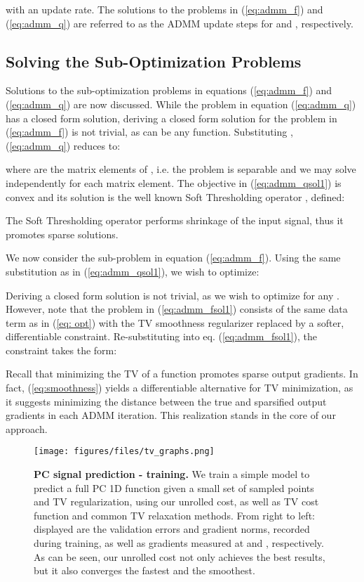 \documentclass[10pt,twocolumn,letterpaper]{article}
\begin{document}
with  an update rate. The solutions to the problems in (\ref{eq:admm_f}) and (\ref{eq:admm_q}) are referred to as the ADMM update steps for  and , respectively.

\subsection{Solving the Sub-Optimization Problems}
Solutions to the sub-optimization problems in equations (\ref{eq:admm_f}) and (\ref{eq:admm_q}) are now discussed. 
While the problem in equation (\ref{eq:admm_q}) has a closed form solution, deriving a closed form solution for the problem in (\ref{eq:admm_f}) is not trivial, as  can be any function.
Substituting , (\ref{eq:admm_q}) reduces to:

where  are the matrix elements of , i.e. the problem is separable and we may solve independently for each matrix element. The objective in (\ref{eq:admm_qsol1}) is convex and its solution is the well known Soft Thresholding operator , defined:

The Soft Thresholding operator performs shrinkage of the input signal, thus it promotes sparse solutions.

We now consider the sub-problem in equation (\ref{eq:admm_f}). Using the same substitution as in (\ref{eq:admm_qsol1}), we wish to optimize:

Deriving a closed form solution is not trivial, as we wish to optimize for any . However, note that the problem in (\ref{eq:admm_fsol1}) consists of the same data term as in (\ref{eq: opt}) with the TV smoothness regularizer replaced by a softer, differentiable constraint. Re-substituting into eq. (\ref{eq:admm_fsol1}), the constraint takes the form:

Recall that minimizing the TV of a function promotes sparse output gradients. In fact, (\ref{eq:smoothness}) yields a differentiable alternative for TV minimization, as it suggests minimizing the  distance between the true and sparsified output gradients in each ADMM iteration. This realization stands in the core of our approach.



\begin{figure*}
\begin{center}
\texttt{[image: figures/files/tv\_graphs.png]}
   \caption{\textbf{PC signal prediction - training.} We train a simple model to predict a full PC 1D function given a small set of sampled points and TV regularization, using our unrolled cost, as well as TV cost function and common TV relaxation methods. From right to left: displayed are the validation errors and gradient norms, recorded during training, as well as gradients measured at  and , respectively. As can be seen, our unrolled cost not only achieves the best results, but it also converges the fastest and the smoothest.}
\label{fig:toy_graphs}
\end{center}
\end{figure*} 
\end{document}
